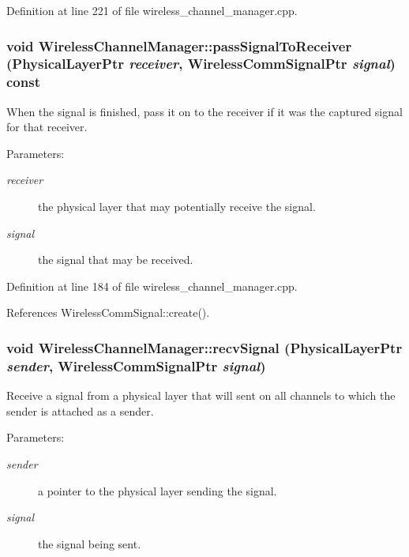 Definition at line 221 of file wireless\_\-channel\_\-manager.cpp.
\subsubsection{\setlength{\rightskip}{0pt plus 5cm}void Wireless\-Channel\-Manager::pass\-Signal\-To\-Receiver (Physical\-Layer\-Ptr {\em receiver}, Wireless\-Comm\-Signal\-Ptr {\em signal}) const}\label{classWirelessChannelManager_865bbde680eea14c28e17a9a84ffcf0b}


When the signal is finished, pass it on to the receiver if it was the captured signal for that receiver. 

\begin{Desc}
\item[Parameters:]
\begin{description}
\item[{\em receiver}]the physical layer that may potentially receive the signal. \item[{\em signal}]the signal that may be received. \end{description}
\end{Desc}


Definition at line 184 of file wireless\_\-channel\_\-manager.cpp.

References Wireless\-Comm\-Signal::create().
\subsubsection{\setlength{\rightskip}{0pt plus 5cm}void Wireless\-Channel\-Manager::recv\-Signal (Physical\-Layer\-Ptr {\em sender}, Wireless\-Comm\-Signal\-Ptr {\em signal})}\label{classWirelessChannelManager_97254e8ed05330d05a3ea02940e60a3f}


Receive a signal from a physical layer that will sent on all channels to which the sender is attached as a sender. 

\begin{Desc}
\item[Parameters:]
\begin{description}
\item[{\em sender}]a pointer to the physical layer sending the signal. \item[{\em signal}]the signal being sent. \end{description}
\end{Desc}


